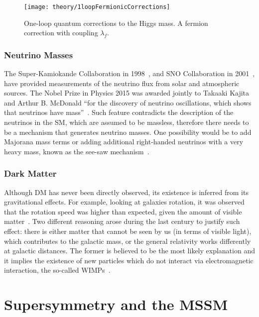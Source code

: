 			\begin{figure}
				\centering
				\texttt{[image: theory/1loopFermionicCorrections]}
				\caption{\label{fig:higgs_f_coupling} One-loop quantum corrections to the Higgs mass. A fermion correction with coupling $\lambda_f$.}
			\end{figure}



		\subsubsection*{Neutrino Masses}

			The Super-Kamiokande Collaboration in 1998~\cite{SK1998}, and SNO Collaboration in 2001~\cite{SNO2001}, have provided measurements of the neutrino flux from solar and atmospheric sources. 
			The Nobel Prize in Physics 2015 was awarded jointly to Takaaki Kajita and Arthur B. McDonald ``for the discovery of neutrino oscillations, which shows that neutrinos have mass''~\cite{Nobel2015}. Such feature contradicts the description of the neutrinos in the \ac{SM}, which are assumed to be massless, therefore there needs to be a mechanism that generates neutrino masses. One possibility would be to add Majorana mass terms or adding additional right-handed neutrinos with a very heavy mass, known as the see-saw mechanism~\cite{Akhmedov1999}.


		\subsubsection*{Dark Matter}

			Although \ac{DM} has never been directly observed, its existence is inferred from its gravitational effects. For example, looking at galaxies rotation, it was observed that the rotation speed was higher than expected, given the amount of visible matter~\cite{Rubin1970}. Two different reasoning arose during the last century to justify such effect: there is either matter that cannot be seen by us (in terms of visible light), which contributes to the galactic mass, or the general relativity works differently at galactic distances. The former is believed to be the most likely explanation and it implies the existence of new particles which do not interact via electromagnetic interaction, the so-called \acp{WIMP}~\cite{oro44361}.



	\section{Supersymmetry and the MSSM}
	\label{sec:SUSY}	

